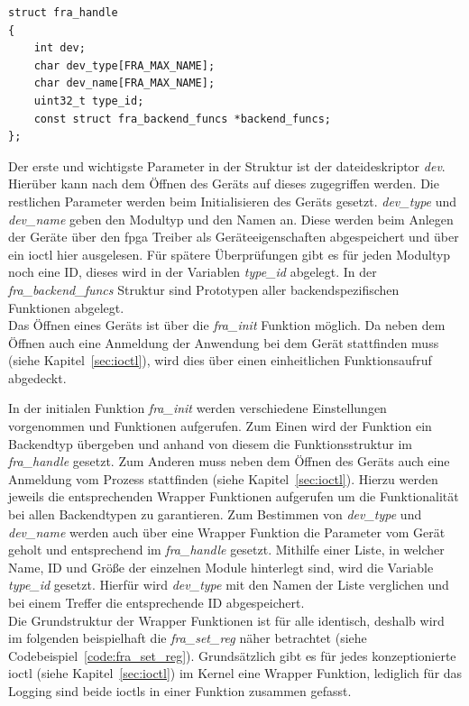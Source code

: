 \begin{lstfloat}
\begin{lstlisting}
struct fra_handle
{
	int dev;
	char dev_type[FRA_MAX_NAME];
	char dev_name[FRA_MAX_NAME];
	uint32_t type_id;
	const struct fra_backend_funcs *backend_funcs;
};
\end{lstlisting}
\end{lstfloat}
Der erste und wichtigste Parameter in der Struktur ist der \gls{dateideskriptor} \textit{dev}. Hierüber kann nach dem Öffnen des Geräts auf dieses zugegriffen werden. Die restlichen Parameter werden beim Initialisieren des Geräts gesetzt. \textit{dev\_type} und \textit{dev\_name} geben den Modultyp und den Namen an. Diese werden beim Anlegen der Geräte über den \ac{fpga} Treiber als Geräteeigenschaften abgespeichert und über ein \ac{ioctl} hier ausgelesen.
Für spätere Überprüfungen gibt es für jeden Modultyp noch eine ID, dieses wird in der Variablen \textit{type\_id} abgelegt. In der \textit{fra\_backend\_funcs} Struktur sind Prototypen aller backendspezifischen Funktionen abgelegt. \\

Das Öffnen eines Geräts ist über die \textit{fra\_init} Funktion möglich. Da neben dem Öffnen auch eine Anmeldung der Anwendung bei dem Gerät stattfinden muss (siehe Kapitel~\ref{sec:ioctl}), wird dies über einen einheitlichen Funktionsaufruf abgedeckt. 

In der initialen Funktion \textit{fra\_init} werden verschiedene Einstellungen vorgenommen und Funktionen aufgerufen. Zum Einen wird der Funktion ein Backendtyp übergeben und anhand von diesem die Funktionsstruktur im \textit{fra\_handle} gesetzt.
Zum Anderen muss neben dem Öffnen des Geräts auch eine Anmeldung vom Prozess stattfinden (siehe Kapitel~\ref{sec:ioctl}). Hierzu werden jeweils die entsprechenden Wrapper Funktionen aufgerufen um die Funktionalität bei allen Backendtypen zu garantieren. Zum Bestimmen von \textit{dev\_type} und \textit{dev\_name} werden auch über eine Wrapper Funktion die Parameter vom Gerät geholt und entsprechend im \textit{fra\_handle} gesetzt. Mithilfe einer Liste, in welcher Name, ID und Größe der einzelnen Module hinterlegt sind, wird die Variable \textit{type\_id} gesetzt. Hierfür wird \textit{dev\_type} mit den Namen der Liste verglichen und bei einem Treffer die entsprechende ID abgespeichert.\\


Die Grundstruktur der Wrapper Funktionen ist für alle identisch, deshalb wird im folgenden beispielhaft die \textit{fra\_set\_reg} näher betrachtet (siehe Codebeispiel~\ref{code:fra_set_reg}). Grundsätzlich gibt es für jedes konzeptionierte \ac{ioctl} (siehe Kapitel~\ref{sec:ioctl}) im Kernel eine Wrapper Funktion, lediglich für das Logging sind beide \ac{ioctl}s in einer Funktion zusammen gefasst.\\ 


